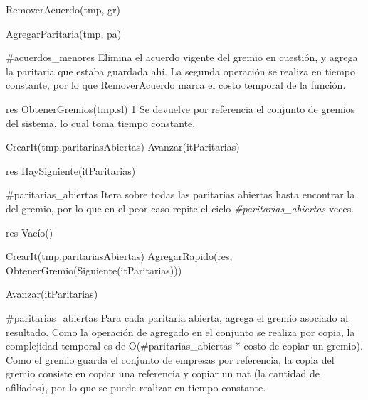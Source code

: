 {
	\state {} \asig RemoverAcuerdo(tmp, gr)			

	\state AgregarParitaria(tmp, pa)									
}
{\#acuerdos\_menores}
{ Elimina el acuerdo vigente del gremio en cuesti\'on, y agrega la paritaria que estaba guardada ah\'i. La segunda operaci\'on se realiza en tiempo constante, por lo que RemoverAcuerdo marca el costo temporal de la funci\'on.}

{
	\state res \asig ObtenerGremios(tmp.sl)								
}
{1}
{ Se devuelve por referencia el conjunto de gremios del sistema, lo cual toma tiempo constante. }

{
	\state {} \asig CrearIt(tmp.paritariasAbiertas)		
			
		\state
		\state Avanzar(itParitarias)				
	\endwhile
	\state

	\state res \asig HaySiguiente(itParitarias)		
}
{\#paritarias\_abiertas}
{ Itera sobre todas las paritarias abiertas hasta encontrar la del gremio, por lo que en el peor caso repite el ciclo \emph{\#paritarias\_abiertas} veces. }

{
	\state res \asig Vac\'io()		
	\state

	\state {} \asig CrearIt(tmp.paritariasAbiertas)		
											
		\state
		\state AgregarRapido(res, ObtenerGremio(Siguiente(itParitarias)))			
		
		\state
		\state Avanzar(itParitarias)										
	\endwhile
}
{\#paritarias\_abiertas}
{ Para cada paritaria abierta, agrega el gremio asociado al resultado. Como la operaci\'on de agregado en el conjunto se realiza por copia, la complejidad temporal es de O(\#paritarias\_abiertas * costo de copiar un gremio). Como el gremio guarda el conjunto de empresas por referencia, la copia del gremio consiste en copiar una referencia y copiar un nat (la cantidad de afiliados), por lo que se puede realizar en tiempo constante. }

